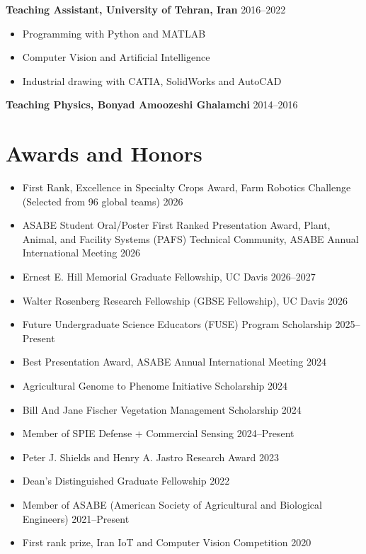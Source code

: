\documentclass[11pt,a4paper]{article}
\begin{document}
\noindent\textbf{Teaching Assistant, University of Tehran, Iran} \hfill 2016--2022
\begin{itemize}
    \item Programming with Python and MATLAB
    \item Computer Vision and Artificial Intelligence
    \item Industrial drawing with CATIA, SolidWorks and AutoCAD
\end{itemize}

\noindent\textbf{Teaching Physics, Bonyad Amoozeshi Ghalamchi} \hfill 2014--2016

\section{Awards and Honors}

\begin{itemize}
    \item First Rank, Excellence in Specialty Crops Award, Farm Robotics Challenge (Selected from 96 global teams) \hfill 2026
    \item ASABE Student Oral/Poster First Ranked Presentation Award, Plant, Animal, and Facility Systems (PAFS) Technical Community, ASABE Annual International Meeting \hfill 2026
    \item Ernest E. Hill Memorial Graduate Fellowship, UC Davis \hfill 2026--2027
    \item Walter Rosenberg Research Fellowship (GBSE Fellowship), UC Davis \hfill 2026
    \item Future Undergraduate Science Educators (FUSE) Program Scholarship \hfill 2025--Present
    \item Best Presentation Award, ASABE Annual International Meeting \hfill 2024
    \item Agricultural Genome to Phenome Initiative Scholarship \hfill 2024
    \item Bill And Jane Fischer Vegetation Management Scholarship \hfill 2024
    \item Member of SPIE Defense + Commercial Sensing \hfill 2024--Present
    \item Peter J. Shields and Henry A. Jastro Research Award \hfill 2023
    \item Dean's Distinguished Graduate Fellowship \hfill 2022
    \item Member of ASABE (American Society of Agricultural and Biological Engineers) \hfill 2021--Present
    \item First rank prize, Iran IoT and Computer Vision Competition \hfill 2020
\end{itemize}
\end{document}
